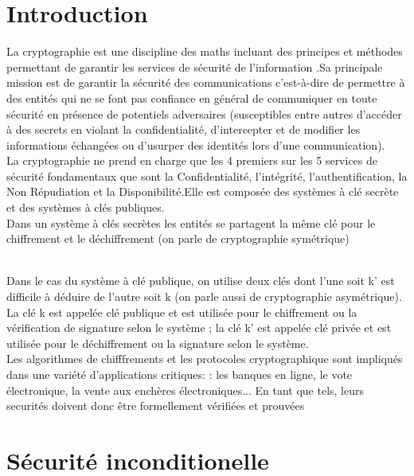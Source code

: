 \section{Introduction}

La cryptographie est une discipline des maths incluant des principes et méthodes permettant de garantir  les services de sécurité de l’information .Sa principale mission  est de garantir la sécurité des communications c'est-à-dire de permettre à des entités qui ne se font pas confiance en général de communiquer en toute sécurité en présence de potentiels adversaires (susceptibles entre autres d'accéder à des secrets en violant la confidentialité, d'intercepter et de modifier les informations échangées ou d'usurper des identités lors d'une communication).
\\
La cryptographie ne prend en charge que les 4 premiers sur les 5 services de sécurité fondamentaux que sont la Confidentialité, l'intégrité, l'authentification, la Non Répudiation et la Disponibilité.Elle est composée des systèmes à clé secrète et des systèmes à clés publiques.
\\
 Dans un système à clés secrètes les entités se partagent la même clé pour le chiffrement et le déchiffrement (on parle de cryptographie symétrique)

 \\
 Dans le cas du système à clé publique, on utilise deux clés dont l'une soit k’ est difficile à déduire de l'autre soit k (on parle aussi de cryptographie asymétrique). La clé k est appelée clé publique et est utilisée pour le chiffrement ou la vérification de signature selon le système ; la clé k’ est appelée clé privée et est utilisée pour le déchiffrement ou la signature selon le système.
 \\

 Les algorithmes de chifffrements et les protocoles cryptographique sont impliqués dans une variété d'applications critiques:
 : les banques en ligne, le vote électronique, la vente aux enchères électroniques... En tant que tels, leurs securités doivent donc être formellement vérifiées et prouvées
 \section{Sécurité inconditionelle}
